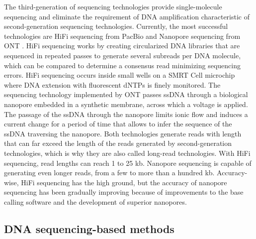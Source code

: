 The third-generation of sequencing technologies provide single-molecule sequencing and eliminate the requirement of \ac{DNA} amplification characteristic of second-generation sequencing technologies. Currently, the most successful technologies are HiFi sequencing from \ac{PacBio} \cite{wenger_accurate_2019, eid_real-time_2009} and Nanopore sequencing from \ac{ONT} \cite{mikheyev_first_2014, stoddart_single-nucleotide_2009}. HiFi sequencing works by creating circularized \ac{DNA} libraries that are sequenced in repeated passes to generate several subreads per \ac{DNA} molecule, which can be compared to determine a consensus read minimizing sequencing errors. HiFi sequencing occurs inside small wells on a \ac{SMRT} Cell microchip where \ac{DNA} extension with fluorescent dNTPs is finely monitored. The sequencing technology implemented by \ac{ONT} passes \ac{ssDNA} through a biological nanopore embedded in a synthetic membrane, across which a voltage is applied. The passage of the \ac{ssDNA} through the nanopore limits ionic flow and induces a current change for a period of time that allows to infer the sequence of the \ac{ssDNA} traversing the nanopore. Both technologies generate reads with length that can far exceed the length of the reads generated by second-generation technologies, which is why they are also called long-read technologies. With HiFi sequencing, read lengths can reach 1 to 25 \ac{kb}. Nanopore sequencing is capable of generating even longer reads, from a few to more than a hundred \ac{kb}. Accuracy-wise, HiFi sequencing has the high ground, but the accuracy of nanopore sequencing has been gradually improving because of improvements to the base calling software and the development of superior nanopores.

\subsection{DNA sequencing-based methods}

